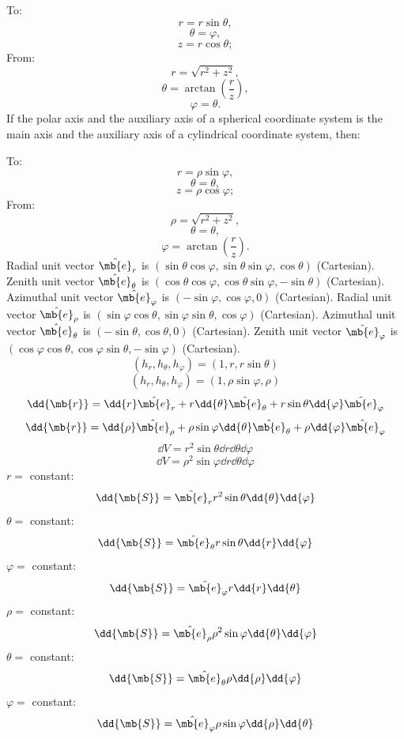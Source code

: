 To:
\[r=r\sin\theta,\]
\[\theta=\varphi,\]
\[z=r\cos\theta;\]
From:
\[r=\sqrt{r^2+z^2},\]
\[\theta=\arctan(\frac{r}{z}),\]
\[\varphi=\theta.\]
If the polar axis and the auxiliary axis of a spherical coordinate system is the main axis and the auxiliary axis of a cylindrical coordinate system, then:

To:
\[r=\rho\sin\varphi,\]
\[\theta=\theta,\]
\[z=\rho\cos\varphi;\]
From:
\[\rho=\sqrt{r^2+z^2},\]
\[\theta=\theta,\]
\[\varphi=\arctan(\frac{r}{z}).\]
Radial unit vector $\hat{\mb{e}}_r$ is $(\sin\theta\cos\varphi,\sin\theta\sin\varphi,\cos\theta)$ (Cartesian). Zenith unit vector $\hat{\mb{e}}_{\theta}$ is $(\cos\theta\cos\varphi,\cos\theta\sin\varphi,-\sin\theta)$ (Cartesian). Azimuthal unit vector $\hat{\mb{e}}_{\varphi}$ is $(-\sin\varphi,\cos\varphi,0)$ (Cartesian).
Radial unit vector $\hat{\mb{e}}_{\rho}$ is $(\sin\varphi\cos\theta,\sin\varphi\sin\theta,\cos\varphi)$ (Cartesian). Azimuthal unit vector $\hat{\mb{e}}_{\theta}$ is $(-\sin\theta,\cos\theta,0)$ (Cartesian). Zenith unit vector $\hat{\mb{e}}_{\varphi}$ is $(\cos\varphi\cos\theta,\cos\varphi\sin\theta,-\sin\varphi)$ (Cartesian).
\[(h_r,h_{\theta},h_{\varphi})=(1,r,r\sin\theta)\]
\[(h_r,h_{\theta},h_{\varphi})=(1,\rho\sin\varphi,\rho)\]
\[\dd{\mb{r}}=\dd{r}\hat{\mb{e}}_r+r\dd{\theta}\hat{\mb{e}}_{\theta}+r\sin\theta\dd{\varphi}\hat{\mb{e}}_{\varphi}\]
\[\dd{\mb{r}}=\dd{\rho}\hat{\mb{e}}_{\rho}+\rho\sin\varphi\dd{\theta}\hat{\mb{e}}_{\theta}+\rho\dd{\varphi}\hat{\mb{e}}_{\varphi}\]
\[\dd{V}=r^2\sin\theta\dd{r}\dd{\theta}\dd{\varphi}\]
\[\dd{V}=\rho^2\sin\varphi\dd{r}\dd{\theta}\dd{\varphi}\]
$r=$ constant:
\[\dd{\mb{S}}=\hat{\mb{e}}_rr^2\sin\theta\dd{\theta}\dd{\varphi}\]
$\theta=$ constant:
\[\dd{\mb{S}}=\hat{\mb{e}}_{\theta}r\sin\theta\dd{r}\dd{\varphi}\]
$\varphi=$ constant:
\[\dd{\mb{S}}=\hat{\mb{e}}_{\varphi}r\dd{r}\dd{\theta}\]
$\rho=$ constant:
\[\dd{\mb{S}}=\hat{\mb{e}}_{\rho}\rho^2\sin\varphi\dd{\theta}\dd{\varphi}\]
$\theta=$ constant:
\[\dd{\mb{S}}=\hat{\mb{e}}_{\theta}\rho\dd{\rho}\dd{\varphi}\]
$\varphi=$ constant:
\[\dd{\mb{S}}=\hat{\mb{e}}_{\varphi}\rho\sin\varphi\dd{\rho}\dd{\theta}\]
